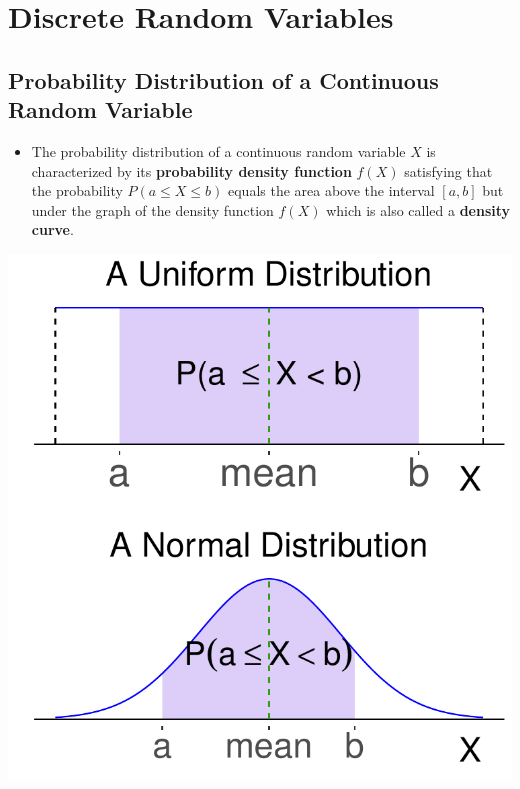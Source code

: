 
\section{Discrete Random Variables}

\hypertarget{probability-distribution-of-a-continuous-random-variable}{%
\subsection{Probability Distribution of a Continuous Random
Variable}\label{probability-distribution-of-a-continuous-random-variable}}

\begin{itemize}
\item
  The probability distribution of a continuous random variable \(X\) is
  characterized by its \textbf{probability density function} \(f(X)\)
  satisfying that the probability \(P(a\leq X\leq b)\) equals the area
  above the interval \([a, b]\) but under the graph of the density
  function \(f(X)\) which is also called a \textbf{density curve}.
\end{itemize}

\begin{fullwidth}
  \colorbox{white}{
    \parbox{\linewidth}{
      \begin{multicols*}{2}
        \includegraphics[width=0.8\linewidth]{figure-latex/unnamed-chunk-8-2-1}
        
        \columnbreak

        \includegraphics[width=0.8\linewidth]{figure-latex/unnamed-chunk-8-3-1}
      \end{multicols*}
    }}
\end{fullwidth}

